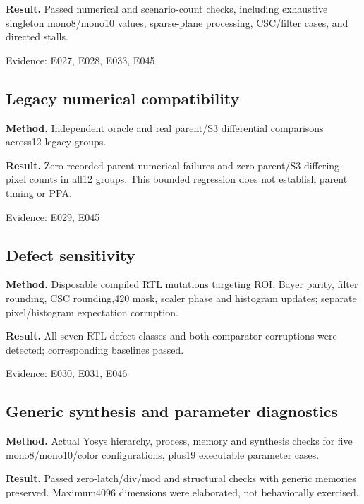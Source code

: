 \documentclass[11pt,a4paper]{article}
\begin{document}
\textbf{Result.} Passed numerical and scenario-count checks,\allowbreak{} including exhaustive singleton mono8/\allowbreak{}mono10 values,\allowbreak{} sparse-plane processing,\allowbreak{} CSC/\allowbreak{}filter cases,\allowbreak{} and directed stalls.

{\small Evidence: E027,\allowbreak{} E028,\allowbreak{} E033,\allowbreak{} E045}

\subsection{Legacy numerical compatibility}

\textbf{Method.} Independent oracle and real parent/\allowbreak{}S3 differential comparisons across12 legacy groups.

\textbf{Result.} Zero recorded parent numerical failures and zero parent/\allowbreak{}S3 differing-pixel counts in all12 groups. This bounded regression does not establish parent timing or PPA.

{\small Evidence: E029,\allowbreak{} E045}

\subsection{Defect sensitivity}

\textbf{Method.} Disposable compiled RTL mutations targeting ROI,\allowbreak{} Bayer parity,\allowbreak{} filter rounding,\allowbreak{} CSC rounding,\allowbreak{}420 mask,\allowbreak{} scaler phase and histogram updates; separate pixel/\allowbreak{}histogram expectation corruption.

\textbf{Result.} All seven RTL defect classes and both comparator corruptions were detected; corresponding baselines passed.

{\small Evidence: E030,\allowbreak{} E031,\allowbreak{} E046}

\subsection{Generic synthesis and parameter diagnostics}

\textbf{Method.} Actual Yosys hierarchy,\allowbreak{} process,\allowbreak{} memory and synthesis checks for five mono8/\allowbreak{}mono10/\allowbreak{}color configurations,\allowbreak{} plus19 executable parameter cases.

\textbf{Result.} Passed zero-latch/\allowbreak{}div/\allowbreak{}mod and structural checks with generic memories preserved. Maximum4096 dimensions were elaborated,\allowbreak{} not behaviorally exercised.
\end{document}
